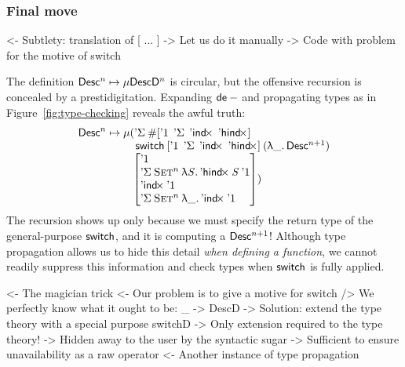 \subsubsection{Final move}

\begin{wstructure}
<- Subtlety: translation of [ ... ]
    -> Let us do it manually
        -> Code with problem for the motive of switch
\end{wstructure}

The definition \(\Desc^n \mapsto \Mu{\DescD^n}\) is circular,
but the offensive recursion is concealed by a prestidigitation.
Expanding \(\toDesc{-}\) and propagating types as in
Figure~\ref{fig:type-checking} reveals the
awful truth:
\[
\Desc^n\mapsto
\Mu{\stk{(\DSigma{\EnumT{\sqr{ \DUnit\:\: \SYMBDSigma\:\: \SYMBDIndx\:\: \SYMBDHindx}}\\}
    {\;\SYMBswitch\:\sqr{ \DUnit\:\: \SYMBDSigma\:\: \SYMBDIndx\:\: \SYMBDHindx}\:(\LAM{\_}\Desc^{n+1})\\
\;\sqr{\stkm{
\DUnit                                            \\
                                   \DSigma{\Set^n}{\LAM{\V{S}} \DHindx{\V{S}}{\DUnit}}   \\
                                   \DIndx{\DUnit}                                    \\
                                   \DSigma{\Set^n}{\LAM{\_} \DIndx{\DUnit}}
}}})}}
\]
The recursion shows up only because we must specify the return type
of the general-purpose \(\F{switch}\), and it is computing a \(\Desc^{n+1}\)!
Although type propagation
allows us to hide this detail \emph{when defining a function}, we cannot
readily suppress this information and check types
when \(\F{switch}\) is fully applied.

\begin{wstructure}
<- The magician trick
    <- Our problem is to give a motive for switch
        /> We perfectly know what it ought to be: \_ -> DescD
    -> Solution: extend the type theory with a special purpose switchD
        -> Only extension required to the type theory!
        -> Hidden away to the user by the syntactic sugar
            -> Sufficient to ensure unavailability as a raw operator
            <- Another instance of type propagation
\end{wstructure}

%
%


